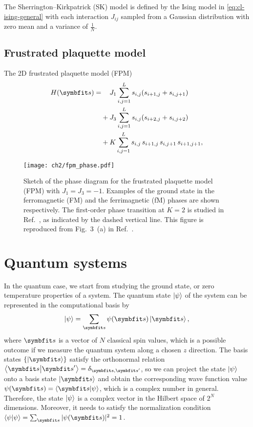 The Sherrington--Kirkpatrick (SK) model is defined by the Ising model in \cref{eq:cl-ising-general} with each interaction $J_{i j}$ sampled from a Gaussian distribution with zero mean and a variance of $\frac{1}{N}$.

\subsection{Frustrated plaquette model}

The 2D frustrated plaquette model (FPM)
\begin{align}
H(\vs) = &\phantom{{}+{}} J_1 \sum_{i, j = 1}^L s_{i, j} (s_{i + 1, j} + s_{i, j + 1}) \nonumber \\
&+ J_3 \sum_{i, j = 1}^L s_{i, j} (s_{i + 2, j} + s_{i, j + 2}) \nonumber \\
&+ K \sum_{i, j = 1}^L s_{i, j} \, s_{i + 1, j} \, s_{i, j + 1} \, s_{i + 1, j + 1},
\label{eq:fpm}
\end{align}

\begin{figure}[htb]
\centering
\texttt{[image: ch2/fpm\_phase.pdf]}
\caption[Phase diagram of frustrated plaquette model (FPM)]{
Sketch of the phase diagram for the frustrated plaquette model (FPM) with $J_1 = J_3 = -1$.
Examples of the ground state in the ferromagnetic (FM) and the ferrimagnetic (fM) phases are shown respectively.
The first-order phase transition at $K = 2$ is studied in Ref.~\cite{wu2021unbiased}, as indicated by the dashed vertical line.
This figure is reproduced from Fig.~3~(a) in Ref.~\cite{wu2021unbiased}.
}
\label{fig:fpm-phase}
\end{figure}

\section{Quantum systems}

In the quantum case, we start from studying the ground state, or zero temperature properties of a system. The quantum state $\ket{\psi}$ of the system can be represented in the computational basis by
\begin{equation}
\ket{\psi} = \sum_\vs \psi(\vs) \ket{\vs},
\end{equation}
where $\vs$ is a vector of $N$ classical spin values, which is a possible outcome if we measure the quantum system along a chosen $z$ direction. The basis states $\{\ket{\vs}\}$ satisfy the orthonormal relation $\ip{\vs}{\vs'} = \delta_{\vs, \vs'}$, so we can project the state $\ket{\psi}$ onto a basis state $\ket{\vs}$ and obtain the corresponding wave function value $\psi(\vs) = \ip{\vs}{\psi}$, which is a complex number in general. Therefore, the state $\ket{\psi}$ is a complex vector in the Hilbert space of $2^N$ dimensions. Moreover, it needs to satisfy the normalization condition $\ip{\psi}{\psi} = \sum_{\vs} |\psi(\vs)|^2 = 1$.


